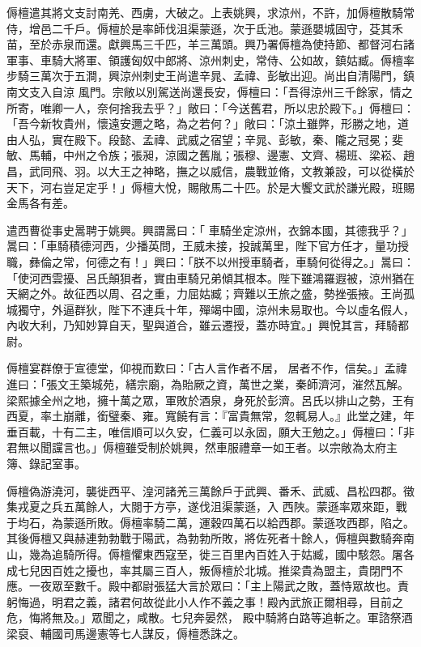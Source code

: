\begin{pinyinscope}
 傉檀遣其將文支討南羌、西虜，大破之。上表姚興，求涼州，不許，加傉檀散騎常侍，增邑二千戶。傉檀於是率師伐沮渠蒙遜，次于氐池。蒙遜嬰城固守，芟其禾苗，至於赤泉而還。獻興馬三千匹，羊三萬頭。興乃署傉檀為使持節、都督河右諸軍事、車騎大將軍、領護匈奴中郎將、涼州刺史，常侍、公如故，鎮姑臧。傉檀率步騎三萬次于五澗，興涼州刺史王尚遣辛晁、孟禕、彭敏出迎。尚出自清陽門，鎮南文支入自涼
 風門。宗敞以別駕送尚還長安，傉檀曰：「吾得涼州三千餘家，情之所寄，唯卿一人，奈何捨我去乎？」敞曰：「今送舊君，所以忠於殿下。」傉檀曰：「吾今新牧貴州，懷遠安邇之略，為之若何？」敞曰：「涼土雖弊，形勝之地，道由人弘，實在殿下。段懿、孟禕、武威之宿望；辛晁、彭敏，秦、隴之冠冕；斐敏、馬輔，中州之令族；張昶，涼國之舊胤；張穆、邊憲、文齊、楊班、梁崧、趙昌，武同飛、羽。以大王之神略，撫之以威信，農戰並脩，文教兼設，可以從橫於天下，河右豈足定乎！」傉檀大悅，賜敞馬二十匹。於是大饗文武於謙光殿，班賜金馬各有差。



 遣西曹從事史暠聘于姚興。興謂暠曰：「
 車騎坐定涼州，衣錦本國，其德我乎？」暠曰：「車騎積德河西，少播英問，王威未接，投誠萬里，陛下官方任才，量功授職，彝倫之常，何德之有！」興曰：「朕不以州授車騎者，車騎何從得之。」暠曰：「使河西雲擾、呂氏顛狽者，實由車騎兄弟傾其根本。陛下雖鴻羅遐被，涼州猶在天網之外。故征西以周、召之重，力屈姑臧；齊難以王旅之盛，勢挫張掖。王尚孤城獨守，外逼群狄，陛下不連兵十年，殫竭中國，涼州未易取也。今以虛名假人，內收大利，乃知妙算自天，聖與道合，雖云遷授，蓋亦時宜。」興悅其言，拜騎都尉。



 傉檀宴群僚于宣德堂，仰視而歎曰：「古人言作者不居，
 居者不作，信矣。」孟禕進曰：「張文王築城苑，繕宗廟，為貽厥之資，萬世之業，秦師濟河，漼然瓦解。梁熙據全州之地，擁十萬之眾，軍敗於酒泉，身死於彭濟。呂氏以排山之勢，王有西夏，率土崩離，銜璧秦、雍。寬饒有言：『富貴無常，忽輒易人。』此堂之建，年垂百載，十有二主，唯信順可以久安，仁義可以永固，願大王勉之。」傉檀曰：「非君無以聞讜言也。」傉檀雖受制於姚興，然車服禮章一如王者。以宗敞為太府主簿、錄記室事。



 傉檀偽游澆河，襲徙西平、湟河諸羌三萬餘戶于武興、番禾、武威、昌松四郡。徵集戎夏之兵五萬餘人，大閱于方亭，遂伐沮渠蒙遜，入
 西陜。蒙遜率眾來距，戰于均石，為蒙遜所敗。傉檀率騎二萬，運穀四萬石以給西郡。蒙遜攻西郡，陷之。其後傉檀又與赫連勃勃戰于陽武，為勃勃所敗，將佐死者十餘人，傉檀與數騎奔南山，幾為追騎所得。傉檀懼東西寇至，徙三百里內百姓入于姑臧，國中駭怨。屠各成七兒因百姓之擾也，率其屬三百人，叛傉檀於北城。推梁貴為盟主，貴閉門不應。一夜眾至數千。殿中都尉張猛大言於眾曰：「主上陽武之敗，蓋恃眾故也。責躬悔過，明君之義，諸君何故從此小人作不義之事！殿內武旅正爾相尋，目前之危，悔將無及。」眾聞之，咸散。七兒奔晏然，
 殿中騎將白路等追斬之。軍諮祭酒梁裒、輔國司馬邊憲等七人謀反，傉檀悉誅之。




\end{pinyinscope}
